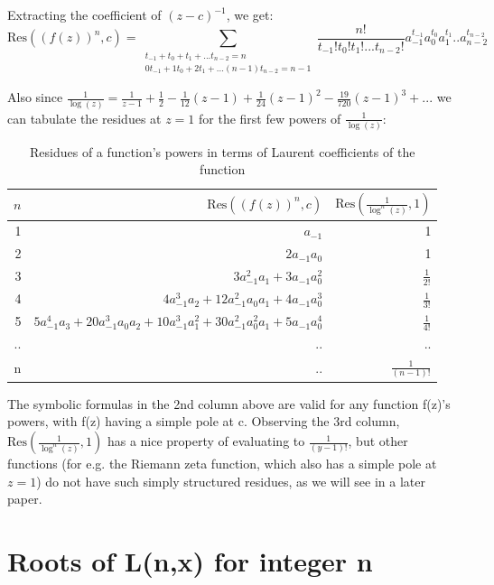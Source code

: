 \documentclass[a4paper,11pt,twoside]{amsart}
\newcommand\Res{\mathrm{Res}}
\begin{document}
Extracting the coefficient of $(z-c)^{-1}$, we get:
$$\Res((f(z))^n,c) =  
\sum\limits_{\substack{t_{-1} + t_0 + t_1 + ... t_{n-2} = n \\ 0t_{-1} + 1t_0 + 2t_1 + ... (n-1)t_{n-2} = n-1}} \frac{n!}{t_{-1}!t_{0}!t_{1}!...t_{n-2}!} a_{-1}^{t_{-1}} a_{0}^{t_0}a_{1}^{t_1}..a_{n-2}^{t_{n-2}}$$
 
Also since $\frac{1}{\log(z)} = \frac{1}{z-1} + \frac{1}{2} - \frac{1}{12} (z-1) + \frac{1}{24}(z-1)^2 - \frac{19}{720}(z-1)^3 + ...$ we can tabulate the residues at $z=1$ for the first few powers of $\frac{1}{\log(z)}$:

\begin{table}[H]
  \begin{center}
    \begin{tabular}{r|r|r} %
      $n$ & $\Res((f(z))^n,c)$ &  $\Res(\frac{1}{\log^{n}(z)},1)$\\
      \hline
      1 &  $a_{-1}$ & 1\\
      2 &  $2a_{-1}a_{0}$ & 1\\
      3 &  $3a_{-1}^2 a_{1} + 3a_{-1} a_{0}^2$ & $\frac{1}{2!}$\\
      4 &  $4a_{-1}^3 a_{2} + 12a_{-1}^2 a_{0} a_{1} + 4a_{-1} a_{0}^3$ & $\frac{1}{3!}$\\
      5 &  $5a_{-1}^4 a_{3} + 20a_{-1}^3 a_{0} a_{2} + 10a_{-1}^3 a_{1}^2 + 30a_{-1}^2 a_{0}^2 a_{1} + 5a_{-1} a_{0}^4$ & $\frac{1}{4!}$\\
      .. & .. & ..\\
      n & .. & $\frac{1}{(n-1)!}$
    \end{tabular}
    \caption{Residues of a function's powers in terms of Laurent coefficients of the function}
  \end{center}
\end{table}
\vspace{-2em}
The symbolic formulas in the 2nd column above are valid for any function f(z)'s powers, with f(z) having a simple pole at c. Observing the 3rd column, $\Res(\frac{1}{\log^{n}(z)},1)$ has a nice property of evaluating to $\frac{1}{(y-1)!}$, but other functions (for e.g. the Riemann zeta function, which also has a simple pole at $z=1$) do not have such simply structured residues, as we will see in a later paper. 

\section{Roots of L(n,x) for integer n}
\end{document}
